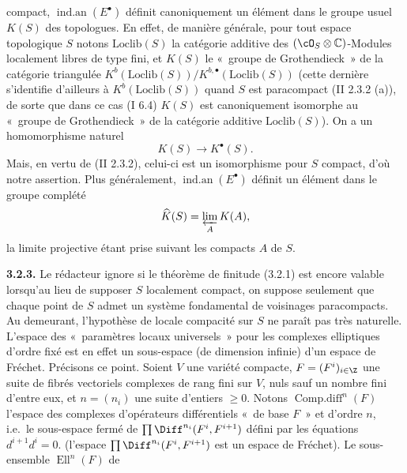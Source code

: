 compact, $\operatorname{ind.an}(E^\bullet)$ définit canoniquement un élément dans le groupe usuel $K(S)$ des topologues. En effet, de manière générale, pour tout espace topologique $S$ notons $\mathrm{Loclib}(S)$ la catégorie additive des $(\cO_S\otimes\mathbb C)$-Modules localement libres de type fini, et $K(S)$ le «~groupe de Grothendieck~» de la catégorie triangulée $K^b(\mathrm{Loclib}(S))/K^{b,\bullet}(\mathrm{Loclib}(S))$ (cette dernière s'identifie d'ailleurs à $K^b(\mathrm{Loclib}(S))$ quand $S$ est paracompact (II 2.3.2 (a)), de sorte que dans ce cas (I 6.4) $K(S)$ est canoniquement isomorphe au «~groupe de Grothendieck~» de la catégorie additive $\mathrm{Loclib}(S)$). On a un homomorphisme naturel
\[
  K(S)\longrightarrow K^\bullet(S).
\]
Mais, en vertu de (II 2.3.2), celui-ci est un isomorphisme pour $S$ compact, d'où notre assertion. Plus généralement, $\operatorname{ind.an}(E^\bullet)$ définit un élément dans le groupe complété
\[
  \widehat K(S)=\varprojlim_A K(A),
\]
la limite projective étant prise suivant les compacts $A$ de $S$.

\textbf{3.2.3.} Le rédacteur ignore si le théorème de finitude (3.2.1) est encore valable lorsqu'au lieu de supposer $S$ localement compact, on suppose seulement que chaque point de $S$ admet un système fondamental de voisinages paracompacts. Au demeurant, l'hypothèse de locale compacité sur $S$ ne paraît pas très naturelle. L'espace des «~paramètres locaux universels~» pour les complexes elliptiques d'ordre fixé est en effet un sous-espace (de dimension infinie) d'un espace de Fréchet. Précisons ce point. Soient $V$ une variété compacte, $F=(F^i)_{i\in\Z}$ une suite de fibrés vectoriels complexes de rang fini sur $V$, nuls sauf un nombre fini d'entre eux, et $n=(n_i)$ une suite d'entiers $\geq 0$. Notons $\operatorname{Comp.diff}^n(F)$ l'espace des complexes d'opérateurs différentiels «~de base $F$~» et d'ordre $n$, i.e.\ le sous-espace fermé de $\prod\Diff^{n_i}(F^i,F^{i+1})$ défini par les équations $d^{i+1}d^i=0$. (l'espace $\prod\Diff^{n_i}(F^i,F^{i+1})$ est un espace de Fréchet). Le sous-ensemble $\operatorname{Ell}^n(F)$ de
